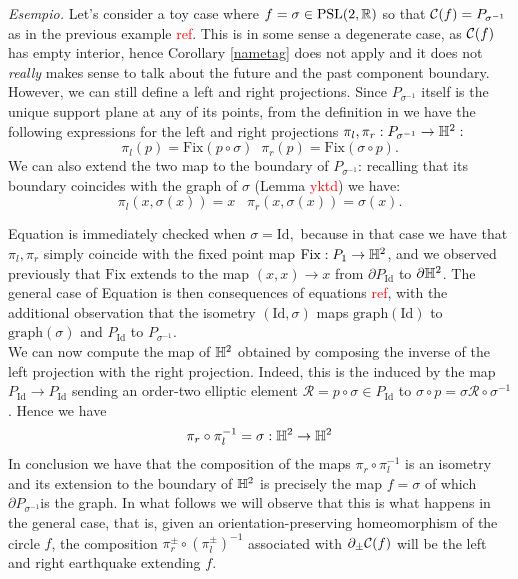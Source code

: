 \textit{Esempio.} Let's consider a toy case where $f=\sigma\in\text{PSL}(2,\mathbb{R})$ so that $\mathcal{C}(f)=P_{\sigma^{-1}}$ as in the previous example \textcolor{red}{ref}. This is  in some sense a degenerate case, as $\mathcal{C}(f)$ has empty interior, hence Corollary \ref{nametag} does not apply and it does not \textit{really} makes sense to talk about the future and the past component boundary. However, we can still define a left and right projections. Since $P_{\sigma^{-1}}$ itself is the unique support plane at any of its points, from the definition in  we have the following expressions for the left and right projections $\pi_l,\pi_r:P_{\sigma^{-1}}\to\mathbb{H}^2:$
\begin{equation}
    \pi_l(p)=\text{Fix}(p\circ\sigma)\;\;\pi_r(p)=\text{Fix}(\sigma\circ p).
\end{equation}   
We can also extend the two map to the boundary of $P_{\sigma^{-1}}$: recalling that its boundary coincides with the graph of $\sigma$ (Lemma \textcolor{red}{yktd}) we have: 
\begin{equation}\label{simproj}
    \pi_l(x,\sigma(x))=x \;\;\;\pi_r(x,\sigma(x))=\sigma(x). 
\end{equation}

Equation  is immediately checked when $\sigma=\text{Id},$ because in that case we have that $\pi_l,\pi_r$ simply coincide with the fixed point map $\text{Fix}:P_1\to\mathbb{H}^2$, and we observed previously that $\text{Fix}$ extends to the map $(x,x)\to x$ from $\partial P_{\text{Id}}$ to $\partial\mathbb{H}^2$. The general case of Equation  is then consequences of equations \textcolor{red}{ref}, with the additional observation that the isometry $(\text{Id},\sigma)$ maps $\text{graph}(\text{Id})$ to $\text{graph}(\sigma)$ and $P_\text{Id}$ to $P_{\sigma^{-1}}$. \\
We can now compute the map of $\mathbb{H}^2$ obtained by composing the inverse of the left projection with the right projection. Indeed, this is the induced by the map $P_{\text{Id}}\to P_\text{Id}$ sending an order-two elliptic element $\mathcal{R}=p\circ\sigma\in P_{\text{Id}}$ to $\sigma\circ p=\sigma\mathcal{R}\circ\sigma^{-1}$. Hence we have   
\begin{equation}\label{composition}
    \pi_r\circ\pi_l^{-1}=\sigma:\mathbb{H}^2\to\mathbb{H}^2
\end{equation}
In conclusion we have that the composition of the maps $\pi_r\circ\pi_l^{-1}$ is an isometry and its extension to the boundary of $\mathbb{H}^2$ is precisely the map $f=\sigma$ of which $\partial P_{\sigma^{-1}}$is the graph. In what follows we will observe that this is what happens in the general case, that is, given an orientation-preserving homeomorphism of the circle $f$, the composition $\pi_r^\pm\circ(\pi_l^\pm)^{-1}$ associated with $\partial_\pm\mathcal{C}(f)$ will be the left and right earthquake extending $f$.

